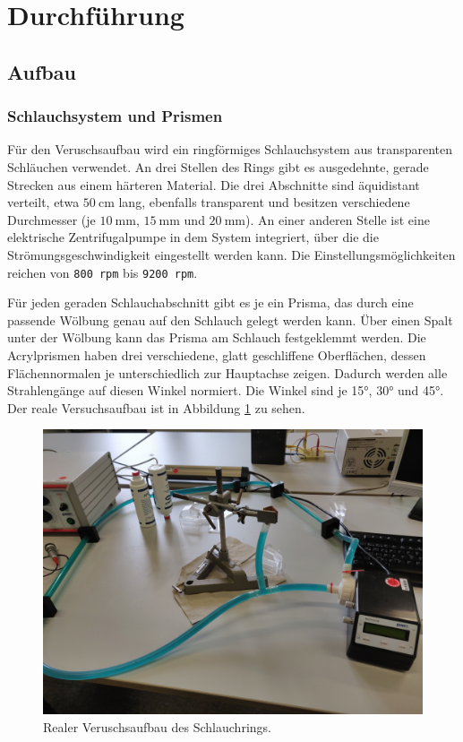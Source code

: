 \section{Durchführung}
\label{sec:Durchführung}

\subsection{Aufbau}
\subsubsection{Schlauchsystem und Prismen}
Für den Veruschsaufbau wird ein ringförmiges Schlauchsystem aus transparenten Schläuchen verwendet. An drei Stellen des Rings gibt es ausgedehnte, gerade Strecken aus einem härteren
Material. Die drei Abschnitte sind äquidistant verteilt, etwa $\SI{50}{\centi\meter}$ lang, ebenfalls transparent und besitzen verschiedene Durchmesser (je $\SI{10}{\milli\meter}$, 
$\SI{15}{\milli\meter}$ und $\SI{20}{\milli\meter}$). An einer anderen Stelle ist eine elektrische Zentrifugalpumpe in dem System integriert, über die die Strömungsgeschwindigkeit
eingestellt werden kann. Die Einstellungsmöglichkeiten reichen von \texttt{800 rpm} bis \texttt{9200 rpm}.

Für jeden geraden Schlauchabschnitt gibt es je ein Prisma, das durch eine passende Wölbung genau auf den Schlauch gelegt werden kann. Über einen Spalt unter der Wölbung kann das Prisma
am Schlauch festgeklemmt werden. Die Acrylprismen haben drei verschiedene, glatt geschliffene Oberflächen, dessen Flächennormalen je unterschiedlich zur Hauptachse zeigen.
Dadurch werden alle Strahlengänge auf diesen Winkel normiert. Die Winkel sind je 15°, 30° und 45°.
Der reale Versuchsaufbau ist in Abbildung \ref{fig:real} zu sehen.

\begin{figure}
    \centering
    \includegraphics[width=.8\textwidth]{media/Schlauchsystem.jpg}
    \caption{Realer Veruschsaufbau des Schlauchrings.}
    \label{fig:real}
\end{figure}

